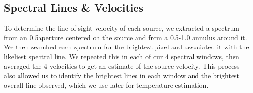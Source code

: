 \subsection{Spectral Lines \& Velocities}
To determine the line-of-sight velocity of each source, we extracted a spectrum
from an 0.5\arcsec aperture centered on the source and from a 0.5-1.0\arcsec
annulus around it.  We then searched each spectrum for the brightest pixel and
associated it with the likeliest spectral line.  We repeated this in each of
our 4 spectral windows, then averaged the 4 velocities to get an estimate of
the source velocity.   This process also allowed us to identify the brightest
lines in each window and the brightest overall line observed, which we use
later for temperature estimation.

